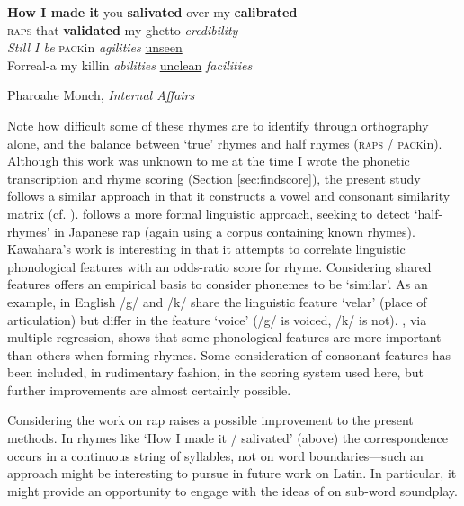 \documentclass[twocolumn, switch, a4paper]{article} %
\begin{document}
\begin{adjustwidth}{0.1\linewidth}{0.1\linewidth}
  \footnotesize
\textbf{How I made it} you \textbf{salivated} over my \textbf{calibrated}\\
\textsc{raps} that \textbf{validated} my ghetto \emph{credibility}\\
\emph{Still I be} \textsc{pack}in \emph{agilities} \underline{unseen}\\
Forreal-a my killin \emph{abilities} \underline{unclean} \emph{facilities}\textellipsis\\
\begin{flushright}
Pharoahe Monch, \emph{Internal Affairs}
\end{flushright}
\end{adjustwidth}
Note how difficult some of these rhymes are to identify through orthography
alone, and the balance between `true' rhymes and half rhymes (\textsc{raps} /
\textsc{pack}in). Although this work was unknown to me at the time I wrote the
phonetic transcription and rhyme scoring (Section \ref{sec:findscore}), the
present study follows a similar approach in that it constructs a vowel and
consonant similarity matrix (cf. ).
 follows a more formal linguistic approach, seeking
to detect `half-rhymes' in Japanese rap (again using a corpus containing known
rhymes). Kawahara's work is interesting in that it attempts to correlate
linguistic phonological features with an odds-ratio score for rhyme. Considering
shared features offers an empirical basis to consider phonemes to be `similar'.
As an example, in English /g/ and /k/ share the linguistic feature `velar'
(place of articulation) but differ in the feature `voice' (/g/ is voiced,
/k/ is not). , via multiple regression, shows
that some phonological features are more important than others when forming
rhymes. Some consideration of consonant features has been included, in
rudimentary fashion, in the scoring system used here, but further improvements
are almost certainly possible.

Considering the work on rap raises a possible improvement to the present
methods. In rhymes like `How I made it / salivated' (above) the correspondence
occurs in a continuous string of syllables, not on word boundaries---such an
approach might be interesting to pursue in future work on Latin. In
particular, it might provide an opportunity to engage with the ideas of
 on sub-word soundplay.
\end{document}
